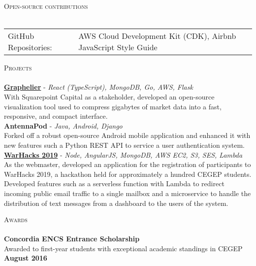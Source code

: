 \documentclass[a4paper]{article}
\newcommand{\lineunder} {
    \vspace*{-8pt} \\
    \hspace*{-18pt} \hrulefill \\
}
\newcommand{\header} [1] {
    {\hspace*{-18pt}\vspace*{6pt} \textsc{#1}}
    \vspace*{-6pt} \lineunder
}
\begin{document}
\header{Open-source contributions}
\vspace*{2mm}
\begin{tabular}{ l l }
    GitHub Repositories:        & AWS Cloud Development Kit (CDK), Airbnb JavaScript Style Guide                            \\
\end{tabular}
\vspace{3mm}

\header{Projects}
\vspace*{2mm}
{\href{https://github.com/Lercerss/graphelier}{\textbf{Graphelier}}} - {\sl React (TypeScript), MongoDB, Go, AWS, Flask} \\
\vspace*{1mm}
With Squarepoint Capital as a stakeholder, developed an open-source visualization tool used to compress gigabytes of market data into a fast, responsive, and compact interface.\\
\vspace*{4mm}
{\textbf{AntennaPod}} - {\sl Java, Android, Django} \\
\vspace*{1mm}
Forked off a robust open-source Android mobile application and enhanced it with new features such a Python REST API to service a user authentication system.\\
\vspace*{4mm}
{\href{https://github.com/FozAhm/quill}{\textbf{WarHacks 2019}}} - {\sl Node, AngularJS, MongoDB, AWS EC2, S3, SES, Lambda} \\
\vspace*{1mm}
As the webmaster, developed an application for the registration of participants to WarHacks 2019, a hackathon held for approximately a hundred CEGEP students.\\
\vspace*{1mm}
Developed features such as a serverless function with Lambda to redirect incoming public email traffic to a single mailbox and a microservice to handle the distribution of text messages from a dashboard to the users of the system.

\vspace*{3mm}

\header{Awards}
\textbf{Concordia ENCS Entrance Scholarship}\\
Awarded to first-year students with exceptional academic standings in CEGEP \hfill \textbf{August 2016}\\
\vspace*{2mm}

\ 
\end{document}
